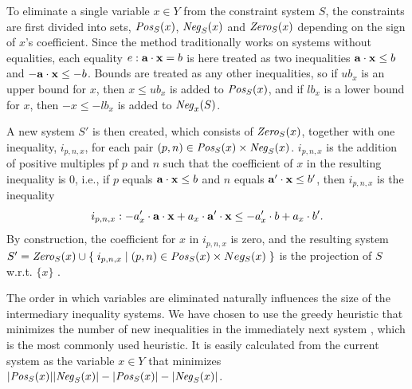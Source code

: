 To eliminate a single variable $x\in Y$ from the constraint system $S$, the constraints are first divided into sets, $\mathit{Pos}_S(x)$, $\mathit{Neg}_S(x)$ and $\mathit{Zero}_S(x)$ depending on the sign of $x$'s coefficient. Since the method traditionally works on systems without equalities, each equality $e: \mathbf{a}\cdot\mathbf{x} = b$ is here treated as two inequalities $\mathbf{a}\cdot\mathbf{x} \leq b$ and $-\mathbf{a}\cdot\mathbf{x} \leq -b$. Bounds are treated as any other inequalities, so if $ub_x$ is an upper bound for $x$, then $x\leq ub_x$ is added to $\mathit{Pos}_S(x)$, and if $lb_x$ is a lower bound for $x$, then $-x\leq - lb_x$ is added to $\mathit{Neg}_x(S)$.

A new system $S'$ is then created, which consists of $\mathit{Zero}_S(x)$, together with one inequality, $i_{p,n,x}$, for each pair $(p,n)\in \mathit{Pos}_S(x)\times \mathit{Neg}_S(x)$. $i_{p,n,x}$ is the addition of positive multiples pf $p$ and $n$ such that the coefficient of $x$ in the resulting inequality is $0$, i.e., if $p$ equals $\mathbf{a}\cdot\mathbf{x} \leq b$ and $n$ equals $\mathbf{a}'\cdot\mathbf{x} \leq b'$, then $i_{p,n,x}$ is the inequality 
\[
i_{p,n,x}: -a'_x\cdot \mathbf{a}\cdot\mathbf{x} + a_x\cdot \mathbf{a}'\cdot\mathbf{x} \leq -a'_x\cdot b + a_x\cdot b'.
\]
By construction, the coefficient for $x$ in $i_{p,n,x}$ is zero, and the resulting system $S' = \mathit{Zero}_S(x) \cup\\
\{\;{i_{p,n,x}}\;|\;{(p,n)\in \mathit{Pos}_S(x)\times Neg_S(x)}\;\}$ is the projection of $S$ w.r.t. $\{x\}$ \cite{Martin99}. %

The order in which variables are eliminated naturally influences the size of the intermediary inequality systems. We have chosen to use the greedy heuristic {that minimizes the number of new inequalities in the immediately next system \cite{duffin74}}, which is the most commonly used heuristic. It is easily calculated from the current system as the variable $x\in Y$ that minimizes $|\mathit{Pos}_S(x)||\mathit{Neg}_S(x)| - |\mathit{Pos}_S(x)|-|\mathit{Neg}_S(x)|$. 


